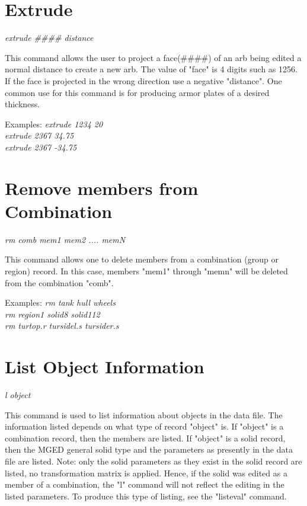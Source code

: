 \section{Extrude}

{\em \center
extrude \#\#\#\# distance
}

This command allows the user to project
a face(\#\#\#\#) of an arb being edited a normal distance to create a new arb.
The value of "face" is 4 digits such as 1256. If the face is projected
in the wrong direction use a negative "distance".
One common use for this command is 
for producing armor plates of a desired thickness.

Examples:
{\em
              extrude 1234 20 \\
              extrude 2367 34.75 \\
              extrude 2367 -34.75 \\
}

\section{Remove members from Combination}

{\em \center
rm comb mem1 mem2 .... memN
}

This command allows one to delete members from a combination (group or region) record. 
In this case, members "mem1" through "memn" will be deleted from
the combination "comb".

Examples:
{\em
              rm tank hull wheels \\
              rm region1 solid8 solid112 \\
              rm turtop.r tursidel.s tursider.s  \\
}

\section{List Object Information}

{\em \center
l object
}

This command is used to list information about objects in the data file.
The information listed depends on what type of record "object" is.
If "object" is a combination record, then the members are listed.
If "object" is a solid record, then the MGED general solid type and
the parameters as presently in the data file are listed.
Note:  only the solid parameters as they exist in the solid record are
listed, no transformation matrix is applied.
Hence, if the solid was edited as a member of a combination, the "l"
command will not reflect the editing in the listed parameters.
To produce this type of listing, see the "listeval" command.

